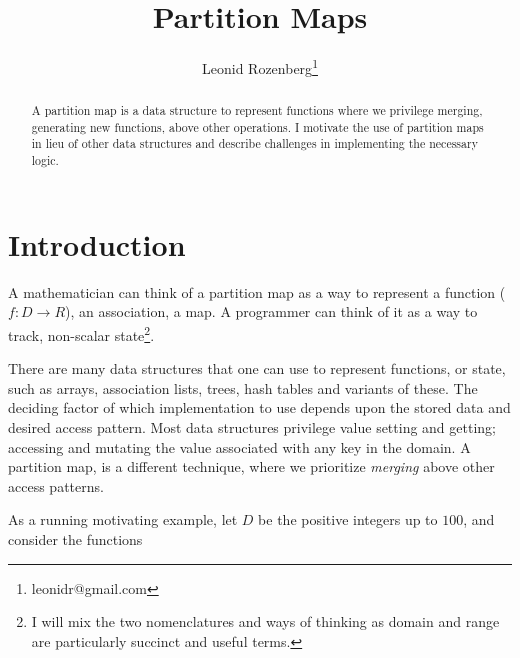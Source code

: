 \documentclass{article}
\begin{document}
\title{Partition Maps}
\author{Leonid Rozenberg\thanks{leonidr@gmail.com}}
\date{}                             %
\maketitle

\begin{abstract}
  A partition map is a data structure to represent functions where we
  privilege merging,
  generating new functions,
  above other operations.
  I motivate the use of partition maps in lieu of other data structures
  and describe challenges in implementing the necessary logic.
\end{abstract}

\section{Introduction}

A mathematician can think of a partition map as a way to represent a function
($f : D \rightarrow R$), an association, a map.
A programmer can think of it as a way to track, non-scalar
state\footnote{I will mix the two nomenclatures and ways of thinking
as domain and range are particularly succinct and useful terms.}.

There are many data structures that one can use to represent functions,
or state,
such as arrays, association lists, trees, hash tables and variants of these.
The deciding factor of which implementation to use depends upon the stored
data and desired access pattern.
Most data structures privilege value setting and getting;
accessing and mutating the value associated with any key in the domain.
A partition map, is a different technique,
where we prioritize \emph{merging} above other access patterns.

As a running motivating example,
let $D$ be the positive integers up to $100$,
and consider the functions
\end{document}
